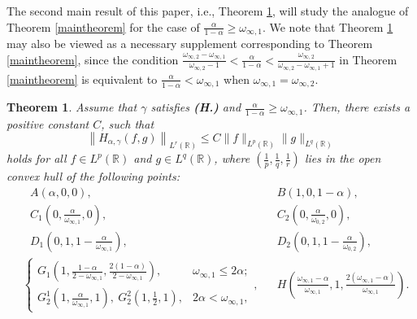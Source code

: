 \documentclass[11pt, twoside, leqno]{article}
\newtheorem{theorem}{Theorem}[section]
\theoremstyle{definition}
\numberwithin{equation}{section}
\begin{document}
The second main result of this paper, i.e., Theorem \ref{maintheorem2}, will study the analogue of Theorem \ref{maintheorem} for the case of $\frac{\alpha}{1-\alpha}\geq \omega_{\infty,1}$. We note that Theorem \ref{maintheorem2} may also be viewed as a necessary supplement corresponding to Theorem \ref{maintheorem}, since the condition $\frac{\omega_{\infty,2}-\omega_{\infty,1}}{\omega_{\infty,2}-1}<\frac{\alpha}{1-\alpha}<\frac{\omega_{\infty,2}}{\omega_{\infty,2}-\omega_{\infty,1}+1}$ in Theorem \ref{maintheorem} is equivalent to $\frac{\alpha}{1-\alpha}<\omega_{\infty,1}$ when $\omega_{\infty,1}=\omega_{\infty,2}$.

\begin{theorem}\label{maintheorem2}
Assume that $\gamma$ satisfies {\bf(H.)} and $\frac{\alpha}{1-\alpha}\geq \omega_{\infty,1}$. Then, there exists a positive constant $C$, such that
$$\left\|H_{\alpha,\gamma}(f,g)\right\|_{L^{r}(\mathbb{R})}\leq C \|f\|_{L^{p}(\mathbb{R})}\|g\|_{L^{q}(\mathbb{R})}$$
holds for all $f\in L^{p}(\mathbb{R})$ and $g\in L^{q}(\mathbb{R})$, where $(\frac{1}{p},\frac{1}{q},\frac{1}{r})$ lies in the open convex hull of the following points:
\begin{align*}
&~~~A\left(\alpha,0,0\right),&&B\left(1,0,1-\alpha\right),\\
&~~~C_1\left(0,\frac{\alpha}{\omega_{\infty,1}},0\right),&&C_2\left(0,\frac{\alpha}{\omega_{0,2}},0\right),\\
&~~~D_1\left(0,1,1-\frac{\alpha}{\omega_{\infty,1}}\right),&&D_2\left(0,1,1-\frac{\alpha}{\omega_{0,2}}\right),\\
&\begin{cases}
G_1\left(1, \frac{1-\alpha}{2-\omega_{\infty,1}}, \frac{2(1-\alpha)}{2-\omega_{\infty,1}}\right),&\omega_{\infty,1}\leq2\alpha;\\
G^1_2\left(1, \frac{\alpha}{\omega_{\infty,1}}, 1\right),~G^2_2\left(1, \frac{1}{2}, 1\right),&2\alpha<\omega_{\infty,1},
\end{cases},&&H\left(\frac{\omega_{\infty,1}-\alpha}{\omega_{\infty,1}}, 1, \frac{2(\omega_{\infty,1}-\alpha)}{\omega_{\infty,1}}\right).
\end{align*}
\end{theorem}
\end{document}
